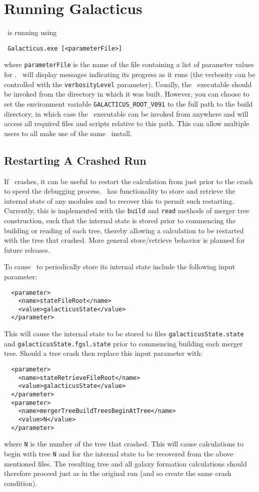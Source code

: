 \section{Running Galacticus}

\glc\ is running using
\begin{verbatim}
 Galacticus.exe [<parameterFile>]
\end{verbatim}
where {\tt parameterFile} is the name of the file containing a list of parameter values for \glc. \glc\ will display messages indicating its progress as it runs (the verbosity can be controlled with the {\tt verbosityLevel} parameter). Usually, the \glc\ executable should be invoked from the directory in which it was built. However, you can choose to set the environment variable {\tt GALACTICUS\_ROOT\_V091} to the full path to the build directory, in which case the \glc\ executable can be invoked from anywhere and will access all required files and scripts relative to this path. This can allow multiple users to all make use of the same \glc\ install.

\subsection{Restarting A Crashed Run}\label{sec:Restarting}

If \glc\ crashes, it can be useful to restart the calculation from just prior to the crash to speed the debugging process. \glc\ has functionality to store and retrieve the internal state of any modules and to recover this to permit such restarting. Currently, this is implemented with the {\tt build} and {\tt read} methods of merger tree construction, such that the internal state is stored prior to commencing the building or reading of each tree, thereby allowing a calculation to be restarted with the tree that crashed. More general store/retrieve behavior is planned for future releases.

To cause \glc\ to periodically store its internal state include the following input parameter:
\begin{verbatim}
  <parameter>
    <name>stateFileRoot</name>
    <value>galacticusState</value>
  </parameter>
\end{verbatim}
This will cause the internal state to be stored to files {\tt galacticusState.state} and {\tt galacticusState.fgsl.state} prior to commencing building each merger tree. Should a tree crash then replace this input parameter with:
\begin{verbatim}
  <parameter>
    <name>stateRetrieveFileRoot</name>
    <value>galacticusState</value>
  </parameter>
  <parameter>
    <name>mergerTreeBuildTreesBeginAtTree</name>
    <value>N</value>
  </parameter>
\end{verbatim}
where {\tt N} is the number of the tree that crashed. This will cause calculations to begin with tree {\tt N} and for the internal state to be recovered from the above mentioned files. The resulting tree and all galaxy formation calculations should therefore proceed just as in the original run (and so create the same crash condition).

